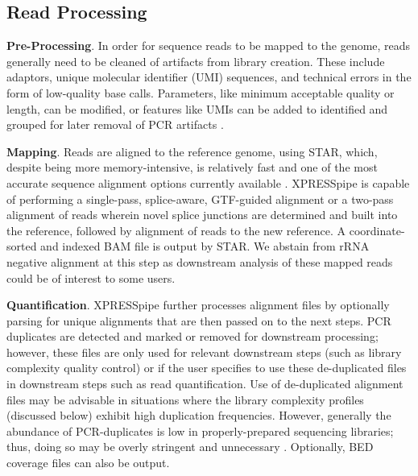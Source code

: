 \documentclass[10pt, oneside]{article}
\begin{document}
\begin{multicols}{2}
\subsection*{Read Processing}
\textbf{Pre-Processing}. In order for sequence reads to be mapped to the genome, reads generally need to be cleaned of artifacts from library creation. These include adaptors, unique molecular identifier (UMI) sequences, and technical errors in the form of low-quality base calls. Parameters, like minimum acceptable quality or length, can be modified, or features like UMIs can be added to identified and grouped for later removal of PCR artifacts \cite{umi, umitools}. \par

\noindent\textbf{Mapping}. Reads are aligned to the reference genome, using STAR, which, despite being more memory-intensive, is relatively fast and one of the most accurate sequence alignment options currently available \cite{star, baruzzo_natmeth}. XPRESSpipe is capable of performing a single-pass, splice-aware, GTF-guided alignment or a two-pass alignment of reads wherein novel splice junctions are determined and built into the reference, followed by alignment of reads to the new reference. A coordinate-sorted and indexed BAM file is output by STAR. We abstain from rRNA negative alignment at this step as downstream analysis of these mapped reads could be of interest to some users. \par

\noindent\textbf{Quantification}. XPRESSpipe further processes alignment files by optionally parsing for unique alignments that are then passed on to the next steps. PCR duplicates are detected and marked or removed for downstream processing; however, these files are only used for relevant downstream steps (such as library complexity quality control) or if the user specifies to use these de-duplicated files in downstream steps such as read quantification. Use of de-duplicated alignment files may be advisable in situations where the library complexity profiles (discussed below) exhibit high duplication frequencies. However, generally the abundance of PCR-duplicates is low in properly-prepared sequencing libraries; thus, doing so may be overly stringent and unnecessary \cite{umi}. Optionally, BED coverage files can also be output. \par


\end{multicols}
\end{document}
